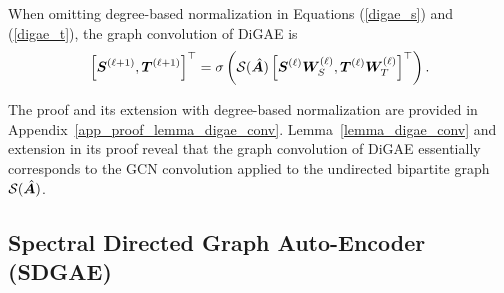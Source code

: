 

\begin{lemma}\label{lemma_digae_conv}
When omitting degree-based normalization in Equations (\ref{digae_s}) and (\ref{digae_t}), the graph convolution of DiGAE is
\begin{equation*}
\left[{\bm{S}}^{(\ell+1)},{\bm{T}}^{(\ell+1)}\right]^{\top} =\sigma\left(\mathcal{S}(\hat{{\bm{A}}})\left[{\bm{S}}^{(\ell)}{\bm{W}}_{S}^{(\ell)},{\bm{T}}^{(\ell)}{\bm{W}}_{T}^{(\ell)}\right]^{\top} \right).
\end{equation*}
\end{lemma}
The proof and its extension with degree-based normalization are provided in Appendix~\ref{app_proof_lemma_digae_conv}. Lemma~\ref{lemma_digae_conv} and extension in its proof reveal that the graph convolution of DiGAE essentially corresponds to the GCN convolution applied to the undirected bipartite graph $\mathcal{S}(\hat{{\bm{A}}})$.




\subsection{Spectral Directed Graph Auto-Encoder (SDGAE)}

